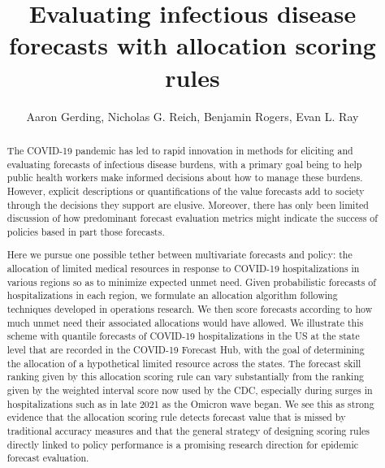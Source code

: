 \documentclass{article}
\title{Evaluating infectious disease forecasts with allocation scoring rules}
\author{Aaron Gerding, Nicholas G. Reich, Benjamin Rogers, Evan L. Ray}
\begin{document}
\newcommand{\del}[2]{\frac{\partial {#1} }{\partial {#2}} }
\newcommand{\dby}[2]{\frac{d {#1} }{d {#2}} }
\newcommand{\sbar}{\overline{s}}
\newtheorem{proposition}{Proposition}

\theoremstyle{remark}
\newtheorem*{remark}{Remark}

\maketitle

\begin{abstract}

The COVID-19 pandemic has led to rapid innovation in methods for eliciting and evaluating forecasts of infectious disease burdens, with a primary goal being to help public health workers make informed decisions about how to manage these burdens. However, explicit descriptions or quantifications of the value forecasts add to society through the decisions they support are elusive.  Moreover, there has only been limited discussion of how predominant forecast evaluation metrics might indicate the success of policies based in part those forecasts.

Here we pursue one possible tether between multivariate forecasts and policy: the allocation of limited medical resources in response to COVID-19 hospitalizations in various regions so as to minimize expected unmet need. Given probabilistic forecasts of hospitalizations in each region, we formulate an allocation algorithm following techniques developed in operations research. We then score forecasts according to how much unmet need their associated allocations would have allowed. We illustrate this scheme with quantile forecasts of COVID-19 hospitalizations in the US at the state level that are recorded in the COVID-19 Forecast Hub, with the goal of determining the allocation of a hypothetical limited resource across the states. The forecast skill ranking given by this allocation scoring rule can vary substantially from the ranking given by the weighted interval score now used by the CDC, especially during surges in hospitalizations such as in late 2021 as the Omicron wave began. We see this as strong evidence that the allocation scoring rule detects forecast value that is missed by traditional accuracy measures and that the general strategy of designing scoring rules directly linked to policy performance is a promising research direction for epidemic forecast evaluation.

\end{abstract}
\end{document}
